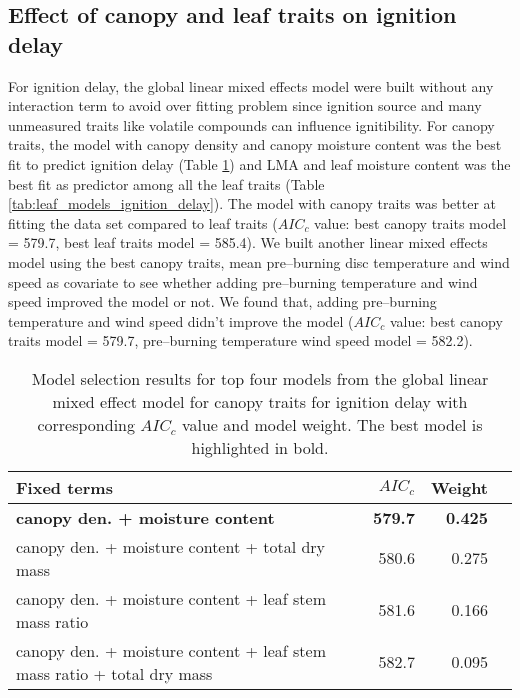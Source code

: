 \documentclass{bmcart}
\begin{document}
\subsection*{Effect of canopy and leaf traits on ignition delay}
For ignition delay, the global linear mixed effects model were built without any interaction term  to avoid over fitting problem since ignition source \citep{anderson1970forest, madrigal2012evaluation} and many unmeasured traits like volatile compounds can influence ignitibility. For canopy traits, the model with canopy density and canopy moisture content was the best fit to predict ignition delay (Table \ref{tab:canopy_models_ignition_delay}) and LMA and leaf moisture content was the best fit as predictor among all the leaf traits (Table \ref{tab:leaf_models_ignition_delay}). The model with canopy traits was better at fitting the data set compared to leaf traits ($AIC_{c}$ value: best canopy traits model = 579.7, best leaf traits model = 585.4). We built another linear mixed effects model using the best canopy traits,  mean pre--burning disc temperature and wind speed as  covariate to see whether adding pre--burning temperature and wind speed improved the model or not. We found that, adding pre--burning temperature and wind speed didn't improve the model ($AIC_{c}$ value: best canopy traits model = 579.7, pre--burning temperature wind speed model = 582.2).

\begin{table}
  \centering
  \caption{Model selection results for top four models from the global linear
    mixed effect model for canopy traits for ignition delay with corresponding
    $AIC_{c}$ value and model weight. The best model is highlighted in bold.}
  \begin{tabular}{lrrr}
    \toprule
    \textbf{Fixed terms} & $AIC_{c}$ & \textbf{Weight}\\
    \midrule
    \textbf{canopy den. + moisture content}    & \textbf{579.7} & \textbf{0.425} \\
    canopy den. + moisture content + total dry mass   & 580.6   & 0.275 \\
    canopy den. + moisture content + leaf stem mass ratio       & 581.6   & 0.166  \\
    canopy den. + moisture content + leaf stem mass ratio + total dry mass & 582.7  & 0.095 \\
    \bottomrule
  \end{tabular}
  \label{tab:canopy_models_ignition_delay}
\end{table}
\end{document}
